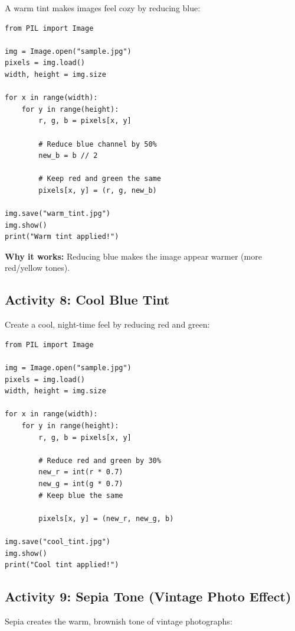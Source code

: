 \documentclass[11pt]{article}
\begin{document}
A warm tint makes images feel cozy by reducing blue:

\begin{lstlisting}
from PIL import Image

img = Image.open("sample.jpg")
pixels = img.load()
width, height = img.size

for x in range(width):
    for y in range(height):
        r, g, b = pixels[x, y]

        # Reduce blue channel by 50%
        new_b = b // 2

        # Keep red and green the same
        pixels[x, y] = (r, g, new_b)

img.save("warm_tint.jpg")
img.show()
print("Warm tint applied!")
\end{lstlisting}

\textbf{Why it works:} Reducing blue makes the image appear warmer (more red/yellow tones).

\subsection*{Activity 8: Cool Blue Tint}

Create a cool, night-time feel by reducing red and green:

\begin{lstlisting}
from PIL import Image

img = Image.open("sample.jpg")
pixels = img.load()
width, height = img.size

for x in range(width):
    for y in range(height):
        r, g, b = pixels[x, y]

        # Reduce red and green by 30%
        new_r = int(r * 0.7)
        new_g = int(g * 0.7)
        # Keep blue the same

        pixels[x, y] = (new_r, new_g, b)

img.save("cool_tint.jpg")
img.show()
print("Cool tint applied!")
\end{lstlisting}

\subsection*{Activity 9: Sepia Tone (Vintage Photo Effect)}

Sepia creates the warm, brownish tone of vintage photographs:
\end{document}
